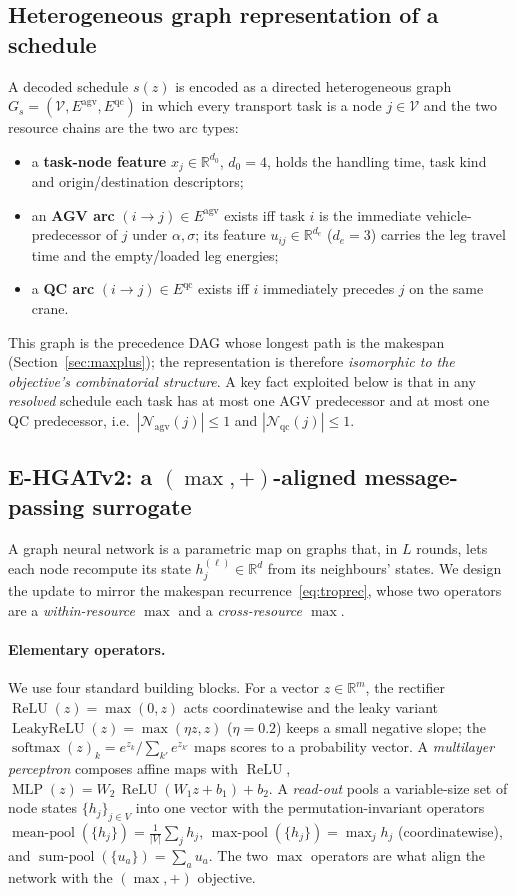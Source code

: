 \documentclass[11pt]{article}
\newcommand{\R}{\mathbb{R}}
\DeclareMathOperator{\softmax}{softmax}
\DeclareMathOperator{\LeakyReLU}{LeakyReLU}
\DeclareMathOperator{\ReLU}{ReLU}
\DeclareMathOperator{\MLP}{MLP}
\begin{document}
\subsection{Heterogeneous graph representation of a schedule}
\label{sec:graphrep}
A decoded schedule $s(z)$ is encoded as a directed heterogeneous graph
$G_s=(\mathcal V,E^{\mathrm{agv}},E^{\mathrm{qc}})$ in which every transport task is a node $j\in\mathcal V$
and the two resource chains are the two arc types:
\begin{itemize}[leftmargin=*,itemsep=2pt]
  \item a \textbf{task-node feature} $x_j\in\R^{d_0}$, $d_0{=}4$, holds the handling time,
  task kind and origin/\allowbreak destination descriptors;
  \item an \textbf{AGV arc} $(i\!\to\! j)\in E^{\mathrm{agv}}$ exists iff task $i$ is the
  immediate vehicle-predecessor of $j$ under $\alpha,\sigma$; its feature
  $u_{ij}\in\R^{d_e}$ ($d_e{=}3$) carries the leg travel time and the empty/loaded leg
  energies;
  \item a \textbf{QC arc} $(i\!\to\! j)\in E^{\mathrm{qc}}$ exists iff $i$ immediately
  precedes $j$ on the same crane.
\end{itemize}
This graph is the precedence DAG whose longest path is the makespan
(Section~\ref{sec:maxplus}); the representation is therefore \emph{isomorphic to the
objective's combinatorial structure}. A key fact exploited
below is that in any \emph{resolved} schedule each task has at most one AGV predecessor and
at most one QC predecessor, i.e.\ $|\mathcal N_{\mathrm{agv}}(j)|\le 1$ and
$|\mathcal N_{\mathrm{qc}}(j)|\le 1$.

\subsection{E-HGATv2: a $(\max,+)$-aligned message-passing surrogate}
\label{sec:ehgat}
A graph neural network is a parametric map on graphs that, in $L$ rounds, lets each node
recompute its state $h_j^{(\ell)}\in\R^{d}$ from its neighbours' states. We design the
update to mirror the makespan recurrence~\eqref{eq:troprec}, whose two operators are a
\emph{within-resource $\max$} and a \emph{cross-resource $\max$}.

\paragraph{Elementary operators.} We use four standard building blocks. For a vector
$z\in\R^{m}$, the rectifier $\ReLU(z)=\max(0,z)$ acts coordinatewise and the leaky variant
$\LeakyReLU(z)=\max(\eta z,z)$ ($\eta{=}0.2$) keeps a small negative slope; the
$\softmax(z)_k=e^{z_k}/\sum_{k'}e^{z_{k'}}$ maps scores to a probability vector. A
\emph{multilayer perceptron} composes affine maps with $\ReLU$,
$\MLP(z)=W_2\,\ReLU(W_1 z+b_1)+b_2$. A \emph{read-out} pools a variable-size set of node
states $\{h_j\}_{j\in V}$ into one vector with the permutation-invariant operators
$\operatorname{mean-pool}(\{h_j\})=\tfrac1{|V|}\sum_j h_j$,
$\operatorname{max-pool}(\{h_j\})=\max_j h_j$ (coordinatewise), and
$\operatorname{sum-pool}(\{u_a\})=\sum_a u_a$. The two $\max$ operators are what align the
network with the $(\max,+)$ objective.
\end{document}
